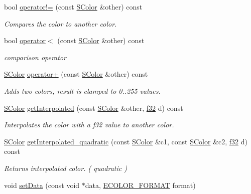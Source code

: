 \begin{DoxyCompactItemize}
bool \hyperlink{classirr_1_1video_1_1SColor_a2d82eec01be437076044d2330fa80322}{operator!=} (const \hyperlink{classirr_1_1video_1_1SColor}{S\+Color} \&other) const
\begin{DoxyCompactList}\small\item\em Compares the color to another color. \end{DoxyCompactList}\item 
bool \hyperlink{classirr_1_1video_1_1SColor_adf45f90ff13a1eb56b5784a3fba20247}{operator$<$} (const \hyperlink{classirr_1_1video_1_1SColor}{S\+Color} \&other) const
\begin{DoxyCompactList}\small\item\em comparison operator \end{DoxyCompactList}\item 
\hyperlink{classirr_1_1video_1_1SColor}{S\+Color} \hyperlink{classirr_1_1video_1_1SColor_a3de50f1cde7bf3f5b1af79c64cd0cdbd}{operator+} (const \hyperlink{classirr_1_1video_1_1SColor}{S\+Color} \&other) const
\begin{DoxyCompactList}\small\item\em Adds two colors, result is clamped to 0..255 values. \end{DoxyCompactList}\item 
\hyperlink{classirr_1_1video_1_1SColor}{S\+Color} \hyperlink{classirr_1_1video_1_1SColor_a20bfa471b5cf672db83355c181a3cae6}{get\+Interpolated} (const \hyperlink{classirr_1_1video_1_1SColor}{S\+Color} \&other, \hyperlink{namespaceirr_a0277be98d67dc26ff93b1a6a1d086b07}{f32} d) const
\begin{DoxyCompactList}\small\item\em Interpolates the color with a f32 value to another color. \end{DoxyCompactList}\item 
\hyperlink{classirr_1_1video_1_1SColor}{S\+Color} \hyperlink{classirr_1_1video_1_1SColor_addb63c4b8832c9bb01e4861e692e5f4f}{get\+Interpolated\+\_\+quadratic} (const \hyperlink{classirr_1_1video_1_1SColor}{S\+Color} \&c1, const \hyperlink{classirr_1_1video_1_1SColor}{S\+Color} \&c2, \hyperlink{namespaceirr_a0277be98d67dc26ff93b1a6a1d086b07}{f32} d) const
\begin{DoxyCompactList}\small\item\em Returns interpolated color. ( quadratic ) \end{DoxyCompactList}\item 
void \hyperlink{classirr_1_1video_1_1SColor_a381f2db0ed17c6b06ba5c8809dce3370}{set\+Data} (const void $\ast$data, \hyperlink{namespaceirr_1_1video_a1d5e487888c32b1674a8f75116d829ed}{E\+C\+O\+L\+O\+R\+\_\+\+F\+O\+R\+M\+AT} format)

\end{DoxyCompactItemize}
